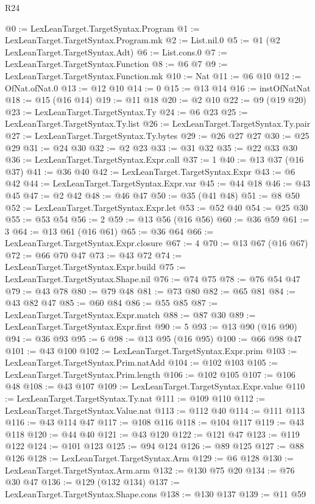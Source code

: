 \begin{lexlean}{R24}
\begin{coremodule}
{{{{{{{{{{{{{{{{{{{{{{{{{{{{{{{{{{{@0 := LexLeanTarget.TargetSyntax.Program
@1 := LexLeanTarget.TargetSyntax.Program.mk
@2 := List.nil.{0}
@5 := @1 (@2 LexLeanTarget.TargetSyntax.Adt)
@6 := List.cons.{0}
@7 := LexLeanTarget.TargetSyntax.Function
@8 := @6 @7
@9 := LexLeanTarget.TargetSyntax.Function.mk
@10 := Nat
@11 := @6 @10
@12 := OfNat.ofNat.{0}
@13 := @12 @10
@14 := 0
@15 := @13 @14
@16 := instOfNatNat
@18 := @15 (@16 @14)
@19 := @11 @18
@20 := @2 @10
@22 := @9 (@19 @20)
@23 := LexLeanTarget.TargetSyntax.Ty
@24 := @6 @23
@25 := LexLeanTarget.TargetSyntax.Ty.list
@26 := LexLeanTarget.TargetSyntax.Ty.pair
@27 := LexLeanTarget.TargetSyntax.Ty.bytes
@29 := @26 @27 @27
@30 := @25 @29
@31 := @24 @30
@32 := @2 @23
@33 := @31 @32
@35 := @22 @33 @30
@36 := LexLeanTarget.TargetSyntax.Expr.call
@37 := 1
@40 := @13 @37 (@16 @37)
@41 := @36 @40
@42 := LexLeanTarget.TargetSyntax.Expr
@43 := @6 @42
@44 := LexLeanTarget.TargetSyntax.Expr.var
@45 := @44 @18
@46 := @43 @45
@47 := @2 @42
@48 := @46 @47
@50 := @35 (@41 @48)
@51 := @8 @50
@52 := LexLeanTarget.TargetSyntax.Expr.let
@53 := @52 @40
@54 := @25 @30
@55 := @53 @54
@56 := 2
@59 := @13 @56 (@16 @56)
@60 := @36 @59
@61 := 3
@64 := @13 @61 (@16 @61)
@65 := @36 @64
@66 := LexLeanTarget.TargetSyntax.Expr.closure
@67 := 4
@70 := @13 @67 (@16 @67)
@72 := @66 @70 @47
@73 := @43 @72
@74 := LexLeanTarget.TargetSyntax.Expr.build
@75 := LexLeanTarget.TargetSyntax.Shape.nil
@76 := @74 @75
@78 := @76 @54 @47
@79 := @43 @78
@80 := @79 @48
@81 := @73 @80
@82 := @65 @81
@84 := @43 @82 @47
@85 := @60 @84
@86 := @55 @85
@87 := LexLeanTarget.TargetSyntax.Expr.match
@88 := @87 @30
@89 := LexLeanTarget.TargetSyntax.Expr.first
@90 := 5
@93 := @13 @90 (@16 @90)
@94 := @36 @93
@95 := 6
@98 := @13 @95 (@16 @95)
@100 := @66 @98 @47
@101 := @43 @100
@102 := LexLeanTarget.TargetSyntax.Expr.prim
@103 := LexLeanTarget.TargetSyntax.Prim.natAdd
@104 := @102 @103
@105 := LexLeanTarget.TargetSyntax.Prim.length
@106 := @102 @105
@107 := @106 @48
@108 := @43 @107
@109 := LexLeanTarget.TargetSyntax.Expr.value
@110 := LexLeanTarget.TargetSyntax.Ty.nat
@111 := @109 @110
@112 := LexLeanTarget.TargetSyntax.Value.nat
@113 := @112 @40
@114 := @111 @113
@116 := @43 @114 @47
@117 := @108 @116
@118 := @104 @117
@119 := @43 @118
@120 := @44 @40
@121 := @43 @120
@122 := @121 @47
@123 := @119 @122
@124 := @101 @123
@125 := @94 @124
@126 := @89 @125
@127 := @88 @126
@128 := LexLeanTarget.TargetSyntax.Arm
@129 := @6 @128
@130 := LexLeanTarget.TargetSyntax.Arm.arm
@132 := @130 @75 @20
@134 := @76 @30 @47
@136 := @129 (@132 @134)
@137 := LexLeanTarget.TargetSyntax.Shape.cons
@138 := @130 @137
@139 := @11 @59
}}}}}}}}}}}}}}}}}}}}}}}}}}}}}}}}}}}
\end{coremodule}
\end{lexlean}
